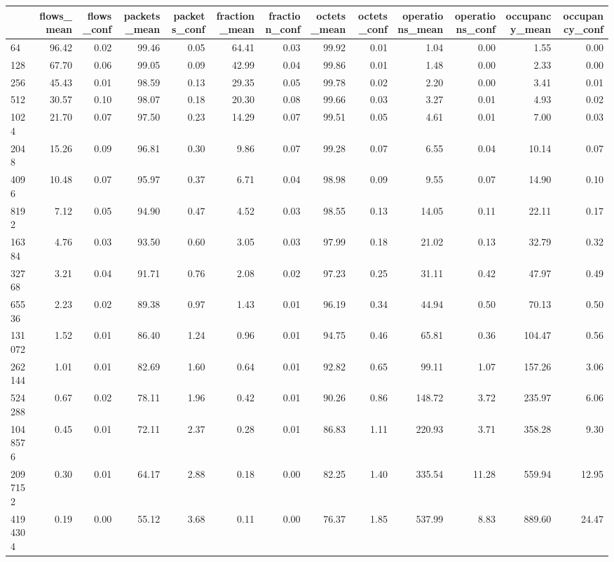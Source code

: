 \begin{tabular}{lrrrrrrrrrrrr}
\toprule
 & flows_mean & flows_conf & packets_mean & packets_conf & fraction_mean & fraction_conf & octets_mean & octets_conf & operations_mean & operations_conf & occupancy_mean & occupancy_conf \\
\midrule
64 & 96.42 & 0.02 & 99.46 & 0.05 & 64.41 & 0.03 & 99.92 & 0.01 & 1.04 & 0.00 & 1.55 & 0.00 \\
128 & 67.70 & 0.06 & 99.05 & 0.09 & 42.99 & 0.04 & 99.86 & 0.01 & 1.48 & 0.00 & 2.33 & 0.00 \\
256 & 45.43 & 0.01 & 98.59 & 0.13 & 29.35 & 0.05 & 99.78 & 0.02 & 2.20 & 0.00 & 3.41 & 0.01 \\
512 & 30.57 & 0.10 & 98.07 & 0.18 & 20.30 & 0.08 & 99.66 & 0.03 & 3.27 & 0.01 & 4.93 & 0.02 \\
1024 & 21.70 & 0.07 & 97.50 & 0.23 & 14.29 & 0.07 & 99.51 & 0.05 & 4.61 & 0.01 & 7.00 & 0.03 \\
2048 & 15.26 & 0.09 & 96.81 & 0.30 & 9.86 & 0.07 & 99.28 & 0.07 & 6.55 & 0.04 & 10.14 & 0.07 \\
4096 & 10.48 & 0.07 & 95.97 & 0.37 & 6.71 & 0.04 & 98.98 & 0.09 & 9.55 & 0.07 & 14.90 & 0.10 \\
8192 & 7.12 & 0.05 & 94.90 & 0.47 & 4.52 & 0.03 & 98.55 & 0.13 & 14.05 & 0.11 & 22.11 & 0.17 \\
16384 & 4.76 & 0.03 & 93.50 & 0.60 & 3.05 & 0.03 & 97.99 & 0.18 & 21.02 & 0.13 & 32.79 & 0.32 \\
32768 & 3.21 & 0.04 & 91.71 & 0.76 & 2.08 & 0.02 & 97.23 & 0.25 & 31.11 & 0.42 & 47.97 & 0.49 \\
65536 & 2.23 & 0.02 & 89.38 & 0.97 & 1.43 & 0.01 & 96.19 & 0.34 & 44.94 & 0.50 & 70.13 & 0.50 \\
131072 & 1.52 & 0.01 & 86.40 & 1.24 & 0.96 & 0.01 & 94.75 & 0.46 & 65.81 & 0.36 & 104.47 & 0.56 \\
262144 & 1.01 & 0.01 & 82.69 & 1.60 & 0.64 & 0.01 & 92.82 & 0.65 & 99.11 & 1.07 & 157.26 & 3.06 \\
524288 & 0.67 & 0.02 & 78.11 & 1.96 & 0.42 & 0.01 & 90.26 & 0.86 & 148.72 & 3.72 & 235.97 & 6.06 \\
1048576 & 0.45 & 0.01 & 72.11 & 2.37 & 0.28 & 0.01 & 86.83 & 1.11 & 220.93 & 3.71 & 358.28 & 9.30 \\
2097152 & 0.30 & 0.01 & 64.17 & 2.88 & 0.18 & 0.00 & 82.25 & 1.40 & 335.54 & 11.28 & 559.94 & 12.95 \\
4194304 & 0.19 & 0.00 & 55.12 & 3.68 & 0.11 & 0.00 & 76.37 & 1.85 & 537.99 & 8.83 & 889.60 & 24.47 \\

\end{tabular}
